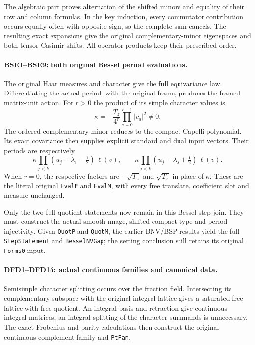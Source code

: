 The algebraic part proves alternation of the shifted minors and
equality of their row and column formulas. In the key induction,
every commutator contribution occurs equally often with opposite
sign, so the complete sum cancels. The resulting exact expansions
give the original complementary-minor eigenspaces and both tensor
Casimir shifts. All operator products keep their prescribed order.

\paragraph{BSE1--BSE9: both original Bessel period evaluations.}
The original Haar measures and character give the full equivariance
law. Differentiating the actual period, with the original frame,
produces the framed matrix-unit action. For $r>0$ the product of
its simple character values is
\[
 \kappa=-\frac{T_z}{4^r}\prod_{a=0}^{r-1}|c_a|^2\ne0.
\]
The ordered complementary minor reduces to the compact Capelli
polynomial. Its exact covariance then supplies explicit standard
and dual input vectors. Their periods are respectively
\[
 \kappa\prod_{j<k}(u_j-\lambda_s-\tfrac12)\,\ell(v),
 \qquad
 \kappa\prod_{j<k}(u_j-\lambda_s+\tfrac12)\,\ell(v).
\]
When $r=0$, the respective factors are
$-\sqrt{T_z}$ and $\sqrt{T_z}$ in place of $\kappa$.
These are the literal original \texttt{EvalP} and \texttt{EvalM},
with every free translate, coefficient slot and measure unchanged.

Only the two full quotient statements now remain in this Bessel
step join. They must construct the actual smooth image, shifted
compact type and period injectivity. Given \texttt{QuotP} and
\texttt{QuotM}, the earlier BNV/BSP results yield the full
\texttt{StepStatement} and \texttt{BesselNVGap}; the setting
conclusion still retains its original \texttt{Forms0} input.

\paragraph{DFD1--DFD15: actual continuous families and canonical data.}
Semisimple character splitting occurs over the fraction field.
Intersecting its complementary subspace with the original integral
lattice gives a saturated free lattice with free quotient.
An integral basis and retraction give continuous integral matrices;
an integral splitting of the character summands is unnecessary.
The exact Frobenius and parity calculations then construct the
original continuous complement family and \texttt{PtFam}.

